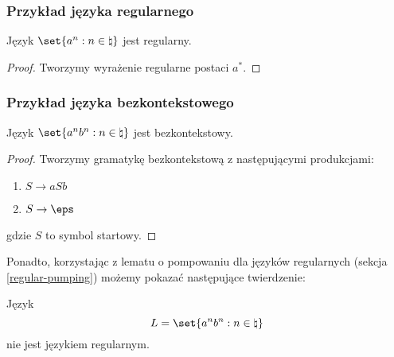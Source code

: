 \subsubsection{Przykład języka regularnego}

\begin{theorem}
Język \( \set{a^n : n \in \natural} \) jest regularny. 
\end{theorem}
\begin{proof}
Tworzymy wyrażenie regularne postaci \(a^*\). 
\end{proof}

\subsubsection{Przykład języka bezkontekstowego}
\label{cfl_example}

\begin{theorem}
Język  \( \set{a^nb^n : n \in \natural} \) jest bezkontekstowy.
\end{theorem}
\begin{proof}
Tworzymy gramatykę bezkontekstową z następującymi produkcjami: \begin{enumerate}
    \item \(S \rightarrow aSb \)
    \item \(S \rightarrow \eps \)
\end{enumerate}
gdzie \(S\) to symbol startowy.

\end{proof}

Ponadto, korzystając z lematu o pompowaniu dla języków regularnych (sekcja \ref{regular-pumping}) możemy pokazać następujące twierdzenie:

\begin{theorem}
    Język
    \[
        L = \set{a^nb^n : n \in \natural}
    \]
    nie jest językiem regularnym.
\end{theorem}

